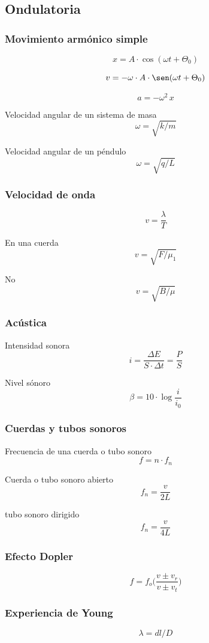 \documentclass[11pt, twocolumn, landscape, a4paper]{article}
\begin{document}
\subsection*{Ondulatoria}

\subsubsection*{Movimiento armónico simple}

$$
x = A \cdot \cos (\omega t + \Theta_{0})
$$

$$
v = - \omega \cdot A \cdot \sen (\omega t + \Theta_{0})
$$

$$
a = -\omega^{2}\,x
$$

Velocidad angular de un sistema de masa
$$
\omega = \sqrt{k / m}
$$

Velocidad angular de un péndulo
$$
\omega = \sqrt{q / L}
$$

\subsubsection*{Velocidad de onda}
$$
v = \dfrac{\lambda}{T}
$$

En una cuerda
$$
v = \sqrt{F / \mu_{1}}
$$

No 
$$
v = \sqrt{B / \mu}
$$

\subsubsection*{Acústica}

Intensidad sonora
$$
i = \dfrac{\Delta E}{S \cdot \Delta t} = \dfrac{P}{S}
$$

Nivel sónoro
$$
\beta = 10 \cdot \log \dfrac{i}{i_{0}}
$$

\subsubsection*{Cuerdas y tubos sonoros}

Frecuencia de una cuerda o tubo sonoro
$$
f = n \cdot f_{n}
$$

Cuerda o tubo sonoro abierto
$$
f_{n} = \dfrac{v}{2L}
$$

tubo sonoro dirigido
$$
f_{n} = \dfrac{v}{4L}
$$

\subsubsection*{Efecto Dopler}
$$
f = f_{o} \Big(\dfrac{v \pm v_{r}}{v \pm v_{t}}\Big)
$$

\subsubsection*{Experiencia de Young}
$$
\lambda = dl / D
$$
\end{document}

